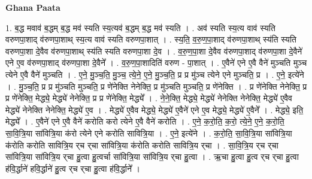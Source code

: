 \documentclass[17pt]{extarticle}
\begin{document}
\textbf{Ghana Paata } \newline

1. ब॒द्ध मवाव॑ ब॒द्धम् ब॒द्ध मव॑ स्यति स्य॒त्यव॑ ब॒द्धम् ब॒द्ध मव॑ स्यति । . अव॑ स्यति स्य॒त्य वाव॑ स्यति वरुणपा॒शाद् व॑रुणपा॒शाथ् स्य॒त्य वाव॑ स्यति वरुणपा॒शात् । . स्य॒ति॒ व॒रु॒ण॒पा॒शाद् व॑रुणपा॒शाथ् स्य॑ति स्यति वरुणपा॒शा दे॒वैव व॑रुणपा॒शाथ् स्य॑ति स्यति वरुणपा॒शा दे॒व । . व॒रु॒ण॒पा॒शा दे॒वैव व॑रुणपा॒शाद् व॑रुणपा॒शा दे॒वैने॑ एने ए॒व व॑रुणपा॒शाद् व॑रुणपा॒शा दे॒वैने᳚ । . व॒रु॒ण॒पा॒शादिति॑ वरुण - पा॒शात् । . ए॒वैने॑ एने ए॒वै वैने॑ मुञ्चति मुञ्च त्येने ए॒वै वैने॑ मुञ्चति । . ए॒ने॒ मु॒ञ्च॒ति॒ मु॒ञ्च॒ त्ये॒ने॒ ए॒ने॒ मु॒ञ्च॒ति॒ प्र प्र मु॑ञ्च त्येने एने मुञ्चति॒ प्र । . ए॒ने॒ इत्ये॑ने । . मु॒ञ्च॒ति॒ प्र प्र मु॑ञ्चति मुञ्चति॒ प्र णे॑नेक्ति नेनेक्ति॒ प्र मु॑ञ्चति मुञ्चति॒ प्र णे॑नेक्ति । . प्र णे॑नेक्ति नेनेक्ति॒ प्र प्र णे॑नेक्ति॒ मेद्ध्ये॒ मेद्ध्ये॑ नेनेक्ति॒ प्र प्र णे॑नेक्ति॒ मेद्ध्ये᳚ । . ने॒ने॒क्ति॒ मेद्ध्ये॒ मेद्ध्ये॑ नेनेक्ति नेनेक्ति॒ मेद्ध्ये॑ ए॒वैव मेद्ध्ये॑ नेनेक्ति नेनेक्ति॒ मेद्ध्ये॑ ए॒व । . मेद्ध्ये॑ ए॒वैव मेद्ध्ये॒ मेद्ध्ये॑ ए॒वैने॑ एने ए॒व मेद्ध्ये॒ मेद्ध्ये॑ ए॒वैने᳚ । . मेद्ध्ये॒ इति॒ मेद्ध्ये᳚ । . ए॒वैने॑ एने ए॒वै वैने॑ करोति करो त्येने ए॒वै वैने॑ करोति । . ए॒ने॒ क॒रो॒ति॒ क॒रो॒ त्ये॒ने॒ ए॒ने॒ क॒रो॒ति॒ सा॒वि॒त्रि॒या सा॑वित्रि॒या क॑रो त्येने एने करोति सावित्रि॒या । . ए॒ने॒ इत्ये॑ने । . क॒रो॒ति॒ सा॒वि॒त्रि॒या सा॑वित्रि॒या क॑रोति करोति सावित्रि॒य र्‌च र्‌चा सा॑वित्रि॒या क॑रोति करोति सावित्रि॒य र्‌चा । . सा॒वि॒त्रि॒य र्‌च र्‌चा सा॑वित्रि॒या सा॑वित्रि॒य र्‌चा हु॒त्वा हु॒त्वर्चा सा॑वित्रि॒या सा॑वित्रि॒य र्‌चा हु॒त्वा । . ऋ॒चा हु॒त्वा हु॒त्व र्‌च र्‌चा हु॒त्वा ह॑वि॒र्द्धाने॑ हवि॒र्द्धाने॑ हु॒त्व र्‌च र्‌चा हु॒त्वा ह॑वि॒र्द्धाने᳚ । \newline
\end{document}
